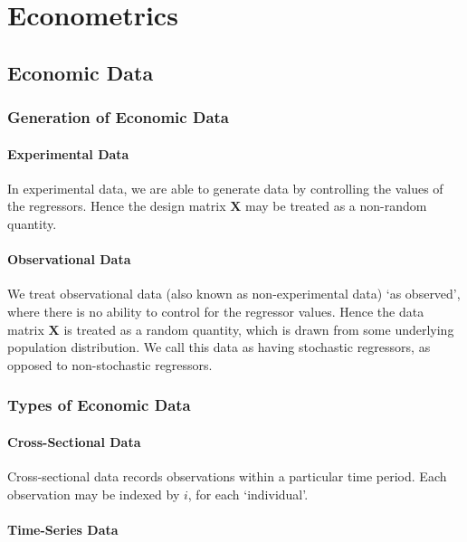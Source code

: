\documentclass[11pt]{report} %
\begin{document}
\chapter{Econometrics}

\section{Economic Data}

\subsection{Generation of Economic Data}

\subsubsection{Experimental Data}

In experimental data, we are able to generate data by controlling the values of the regressors. Hence the design matrix $\mathbf{X}$ may be treated as a non-random quantity.

\subsubsection{Observational Data}

We treat observational data (also known as non-experimental data) `as observed', where there is no ability to control for the regressor values. Hence the data matrix $\mathbf{X}$ is treated as a random quantity, which is drawn from some underlying population distribution. We call this data as having stochastic regressors, as opposed to non-stochastic regressors.

\subsection{Types of Economic Data}

\subsubsection{Cross-Sectional Data}

Cross-sectional data records observations within a particular time period. Each observation may be indexed by $i$, for each `individual'.

\subsubsection{Time-Series Data}
\end{document}
